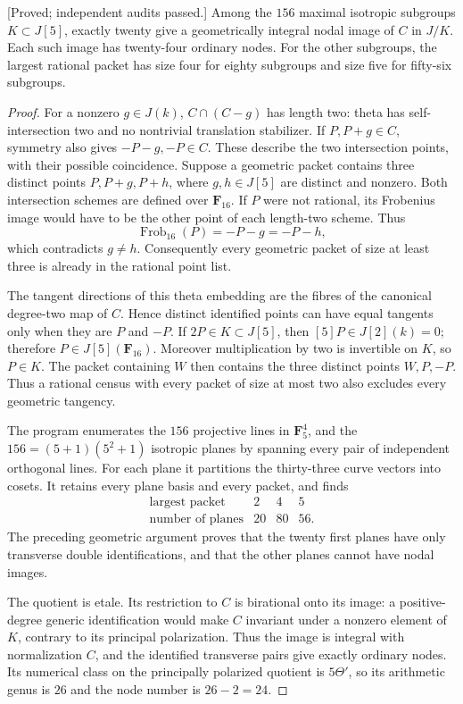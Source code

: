 \begin{lemma}
\label{lem:five-theta-geometric-census-candidate}
\textup{[Proved; independent audits passed.]}
Among the $156$ maximal isotropic subgroups $K\subset J[5]$, exactly
twenty give a geometrically integral nodal image of $C$ in $J/K$.
Each such image has twenty-four ordinary nodes. For the other
subgroups, the largest rational packet has size four for eighty
subgroups and size five for fifty-six subgroups.
\end{lemma}
\begin{proof}
For a nonzero $g\in J(k)$, $C\cap(C-g)$ has length two: theta has
self-intersection two and no nontrivial translation stabilizer.
If $P,P+g\in C$, symmetry also gives $-P-g,-P\in C$.
These describe the two intersection points, with their possible
coincidence. Suppose a geometric packet contains three distinct
points $P,P+g,P+h$, where $g,h\in J[5]$ are distinct and nonzero.
Both intersection schemes are defined over $\mathbf F_{16}$.
If $P$ were not rational, its Frobenius image would have to be
the other point of each length-two scheme. Thus
\[
             \operatorname{Frob}_{16}(P)=-P-g=-P-h,
\]
which contradicts $g\ne h$. Consequently every geometric packet
of size at least three is already in the rational point list.

The tangent directions of this theta embedding are the fibres of
the canonical degree-two map of $C$. Hence distinct identified
points can have equal tangents only when they are $P$ and $-P$.
If $2P\in K\subset J[5]$, then $[5]P\in J[2](k)=0$; therefore
$P\in J[5](\mathbf F_{16})$. Moreover multiplication by two is
invertible on $K$, so $P\in K$. The packet containing $W$ then
contains the three distinct points $W,P,-P$. Thus a rational
census with every packet of size at most two also excludes every
geometric tangency.

The program enumerates the $156$ projective lines in
$\mathbf F_5^4$, and the $156=(5+1)(5^2+1)$ isotropic planes by
spanning every pair of independent orthogonal lines. For each
plane it partitions the thirty-three curve vectors into cosets.
It retains every plane basis and every packet, and finds
\[
 \begin{array}{c|ccc}
 \text{largest packet}&2&4&5\\ \hline
 \text{number of planes}&20&80&56.
 \end{array}
\]
The preceding geometric argument proves that the twenty first
planes have only transverse double identifications, and that the
other planes cannot have nodal images.

The quotient is etale. Its restriction to $C$ is birational onto
its image: a positive-degree generic identification would make
$C$ invariant under a nonzero element of $K$, contrary to its
principal polarization. Thus the image is integral with
normalization $C$, and the identified transverse pairs give exactly
ordinary nodes. Its numerical class on the principally polarized
quotient is $5\Theta'$, so its arithmetic genus is $26$ and the
node number is $26-2=24$.
\end{proof}

